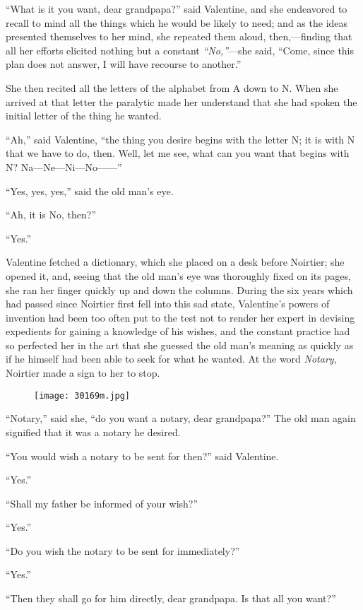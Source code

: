 “What is it you want, dear grandpapa?” said Valentine, and she
endeavored to recall to mind all the things which he would be likely to
need; and as the ideas presented themselves to her mind, she repeated
them aloud, then,—finding that all her efforts elicited nothing but a
constant \textit{“No,”}—she said, “Come, since this plan does not answer, I
will have recourse to another.”

She then recited all the letters of the alphabet from A down to N. When
she arrived at that letter the paralytic made her understand that she
had spoken the initial letter of the thing he wanted.

“Ah,” said Valentine, “the thing you desire begins with the letter N;
it is with N that we have to do, then. Well, let me see, what can you
want that begins with N? Na—Ne—Ni—No——”

“Yes, yes, yes,” said the old man’s eye.

“Ah, it is No, then?”

“Yes.”

Valentine fetched a dictionary, which she placed on a desk before
Noirtier; she opened it, and, seeing that the old man’s eye was
thoroughly fixed on its pages, she ran her finger quickly up and down
the columns. During the six years which had passed since Noirtier first
fell into this sad state, Valentine’s powers of invention had been too
often put to the test not to render her expert in devising expedients
for gaining a knowledge of his wishes, and the constant practice had so
perfected her in the art that she guessed the old man’s meaning as
quickly as if he himself had been able to seek for what he wanted. At
the word \textit{Notary}, Noirtier made a sign to her to stop.

\begin{figure}[ht]
\texttt{[image: 30169m.jpg]}
\end{figure}

“Notary,” said she, “do you want a notary, dear grandpapa?” The old man
again signified that it was a notary he desired.

“You would wish a notary to be sent for then?” said Valentine.

“Yes.”

“Shall my father be informed of your wish?”

“Yes.”

“Do you wish the notary to be sent for immediately?”

“Yes.”

“Then they shall go for him directly, dear grandpapa. Is that all you
want?”

